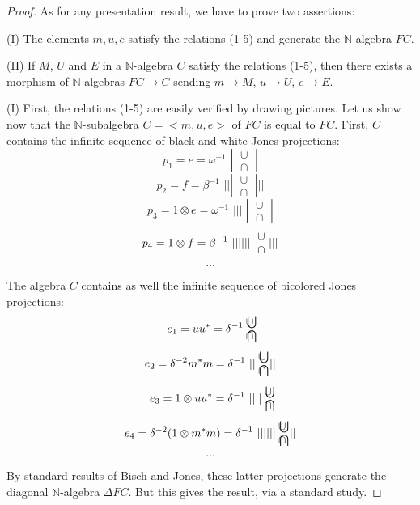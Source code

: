 \documentclass[12pt]{amsbook}
\begin{document}
\begin{proof}
As for any presentation result, we have to prove two assertions:

\medskip

(I) The elements $m,u,e$ satisfy the relations (1-5) and generate the
$\mathbb N$-algebra $FC$.

\medskip

(II) If  $M$, $U$ and $E$ in a $\mathbb N$-algebra $C$ satisfy the relations
(1-5), then there exists a morphism of $\mathbb N$-algebras $FC\to C$
sending $m\to M$, $u\to U$, $e\to E$.

\medskip

(I) First, the relations (1-5) are easily verified by drawing pictures. Let us show now that the $\mathbb N$-subalgebra $C=<m,u,e>$ of $FC$ is equal to $FC$. First, $C$ contains the infinite sequence of black and white Jones projections:
$$p_1=e=\omega^{-1}\,\,|\ \begin{matrix}\cup\\\cap\end{matrix}\ |$$
$$p_2=f=\beta^{-1}\,\,|||\ \begin{matrix}\cup\\\cap\end{matrix}\ |||$$
$$p_3=1\otimes e=\omega^{-1}\,\,|||||\ \begin{matrix}\cup\\\cap\end{matrix}\ |$$
$$p_4=1\otimes f=\beta^{-1}\,\,|||||||\ \begin{matrix}\cup\cr\cap\end{matrix}\ |||$$
$$\ldots$$

The algebra $C$ contains as well the infinite sequence of bicolored Jones projections:
$$e_1=uu^*=\delta^{-1}\,\,\begin{matrix}\bigcup\hskip -3.9mm\cup\\ \bigcap\hskip -3.9mm\cap\end{matrix}$$
$$e_2=\delta^{-2}m^*m=\delta^{-1}\,\,||\ \begin{matrix}\bigcup\hskip -3.86mm\cup\\\bigcap\hskip -3.86mm\cap\end{matrix}\ ||$$
$$e_3=1\otimes uu^*=\delta^{-1}\,\,||||\ \begin{matrix}\bigcup\hskip -3.86mm\cup\\ \bigcap\hskip -3.86mm\cap\end{matrix}$$
$$e_4=\delta^{-2}(1\otimes m^*m)=\delta^{-1}\,\,||||||\ \begin{matrix}\bigcup\hskip -3.86mm\cup\\\bigcap\hskip -3.86mm\cap\end{matrix}\ ||$$
$$\ldots$$

By standard results of Bisch and Jones, these latter projections generate the diagonal $\mathbb N$-algebra $\Delta FC$. But this gives the result, via a standard study.
\end{proof}
\end{document}

